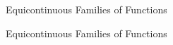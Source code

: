 \begin{section}{Equicontinuous Families of Functions}

\end{section}\begin{section}{Equicontinuous Families of Functions}

\end{section}